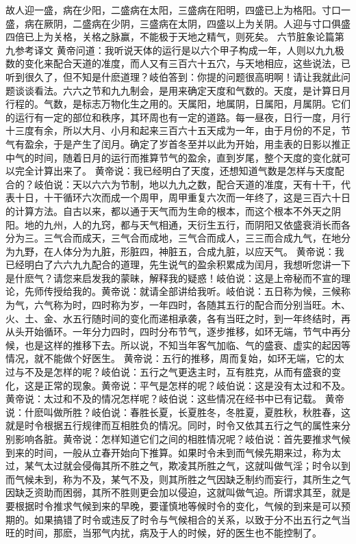 \documentclass[a4paper,12pt,UTF8,twoside]{ctexbook}
\begin{document}
故人迎一盛，病在少阳，二盛病在太阳，三盛病在阳明，四盛已上为格阳。寸口一盛，病在厥阴，二盛病在少阴，三盛病在太阴，四盛以上为关阴。人迎与寸口俱盛四倍已上为关格，关格之脉赢，不能极于天地之精气，则死矣。
六节脏象论篇第九参考译文
黄帝问道：我听说天体的运行是以六个甲子构成一年，人则以九九极数的变化来配合天道的准度，而人又有三百六十五穴，与天地相应，这些说法，已听到很久了，但不知是什麽道理？岐伯答到：你提的问题很高明啊！请让我就此问题谈谈看法。六六之节和九九制会，是用来确定天度和气数的。天度，是计算日月行程的。气数，是标志万物化生之用的。天属阳，地属阴，日属阳，月属阴。它们的运行有一定的部位和秩序，其环周也有一定的道路。每一昼夜，日行一度，月行十三度有余，所以大月、小月和起来三百六十五天成为一年，由于月份的不足，节气有盈余，于是产生了闰月。确定了岁首冬至并以此为开始，用圭表的日影以推正中气的时间，随着日月的运行而推算节气的盈余，直到岁尾，整个天度的变化就可以完全计算出来了。
黄帝说：我已经明白了天度，还想知道气数是怎样与天度配合的？岐伯说：天以六六为节制，地以九九之数，配合天道的准度，天有十干，代表十日，十干循环六次而成一个周甲，周甲重复六次而一年终了，这是三百六十日的计算方法。自古以来，都以通于天气而为生命的根本，而这个根本不外天之阴阳。地的九州，人的九窍，都与天气相通，天衍生五行，而阴阳又依盛衰消长而各分为三。三气合而成天，三气合而成地，三气合而成人，三三而合成九气，在地分为九野，在人体分为九脏，形脏四，神脏五，合成九脏，以应天气。
黄帝说：我已经明白了六六九九配合的道理，先生说气的盈余积累成为闰月，我想听您讲一下是什麽气？请您来启发我的蒙昧，解释我的疑惑！岐伯说：这是上帝秘而不宣的理论，先师传授给我的。黄帝说：就请全部讲给我听。岐伯说：五日称为候，三候称为气，六气称为时，四时称为岁，一年四时，各随其五行的配合而分别当旺。木、火、土、金、水五行随时间的变化而递相承袭，各有当旺之时，到一年终结时，再从头开始循环。一年分力四时，四时分布节气，逐步推移，如环无端，节气中再分候，也是这样的推移下去。所以说，不知当年客气加临、气的盛衰、虚实的起因等情况，就不能做个好医生。
黄帝说：五行的推移，周而复始，如环无端，它的太过与不及是怎样的呢？岐伯说：五行之气更迭主时，互有胜克，从而有盛衰的变化，这是正常的现象。黄帝说：平气是怎样的呢？岐伯说：这是没有太过和不及。黄帝说：太过和不及的情况怎样呢？岐伯说：这些情况在经书中已有记载。
黄帝说：什麽叫做所胜？岐伯说：春胜长夏，长夏胜冬，冬胜夏，夏胜秋，秋胜春，这就是时令根据五行规律而互相胜负的情况。同时，时令又依其五行之气的属性来分别影响各脏。黄帝说：怎样知道它们之间的相胜情况呢？岐伯说：首先要推求气候到来的时间，一般从立春开始向下推算。如果时令未到而气候先期来过，称为太过，某气太过就会侵侮其所不胜之气，欺凌其所胜之气，这就叫做气淫；时令以到而气候未到，称为不及，某气不及，则其所胜之气因缺乏制约而妄行，其所生之气因缺乏资助而困弱，其所不胜则更会加以侵迫，这就叫做气迫。所谓求其至，就是要根据时令推求气候到来的早晚，要谨慎地等候时令的变化，气候的到来是可以预期的。如果搞错了时令或违反了时令与气候相合的关系，以致于分不出五行之气当旺的时间，那麽，当邪气内扰，病及于人的时候，好的医生也不能控制了。
\end{document}
